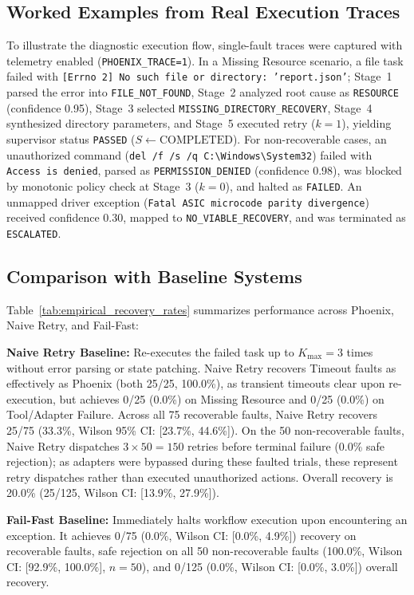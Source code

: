 \documentclass[conference]{IEEEtran}
\newcommand{\chg}[1]{{\color{blue}#1}}
\begin{document}
\subsection{\chg{Worked Examples from Real Execution Traces}}
\chg{To illustrate the diagnostic execution flow, single-fault traces were captured with telemetry enabled (\texttt{PHOENIX\_TRACE=1}). In a Missing Resource scenario, a file task failed with \texttt{[Errno 2] No such file or directory: 'report.json'}; Stage~1 parsed the error into \texttt{FILE\_NOT\_FOUND}, Stage~2 analyzed root cause as \texttt{RESOURCE} (confidence 0.95), Stage~3 selected \texttt{MISSING\_DIRECTORY\_RECOVERY}, Stage~4 synthesized directory parameters, and Stage~5 executed retry ($k=1$), yielding supervisor status \texttt{PASSED} ($S \leftarrow \text{COMPLETED}$). For non-recoverable cases, an unauthorized command (\texttt{del /f /s /q C:\textbackslash Windows\textbackslash System32}) failed with \texttt{Access is denied}, parsed as \texttt{PERMISSION\_DENIED} (confidence 0.98), was blocked by monotonic policy check at Stage~3 ($k=0$), and halted as \texttt{FAILED}. An unmapped driver exception (\texttt{Fatal ASIC microcode parity divergence}) received confidence 0.30, mapped to \texttt{NO\_VIABLE\_RECOVERY}, and was terminated as \texttt{ESCALATED}.}

\subsection{Comparison with Baseline Systems}
Table~\ref{tab:empirical_recovery_rates} summarizes performance across Phoenix, Naive Retry, and Fail-Fast:

\textbf{Naive Retry Baseline:} Re-executes the failed task up to $K_{\text{max}} = 3$ times without error parsing or state patching. Naive Retry recovers Timeout faults as effectively as Phoenix (both 25/25, 100.0\%), as transient timeouts clear upon re-execution, but achieves 0/25 (0.0\%) on Missing Resource and 0/25 (0.0\%) on Tool/Adapter Failure. Across all 75 recoverable faults, Naive Retry recovers 25/75 (33.3\%, Wilson 95\% CI: [23.7\%, 44.6\%]). On the 50 non-recoverable faults, Naive Retry dispatches $3 \times 50 = 150$ retries before terminal failure (0.0\% safe rejection); as adapters were bypassed during these faulted trials, these represent retry dispatches rather than executed unauthorized actions. Overall recovery is 20.0\% (25/125, Wilson CI: [13.9\%, 27.9\%]).

\textbf{Fail-Fast Baseline:} Immediately halts workflow execution upon encountering an exception. It achieves 0/75 (0.0\%, Wilson CI: [0.0\%, 4.9\%]) recovery on recoverable faults, safe rejection on all 50 non-recoverable faults (100.0\%, Wilson CI: [92.9\%, 100.0\%], $n=50$), and 0/125 (0.0\%, Wilson CI: [0.0\%, 3.0\%]) overall recovery.
\end{document}
